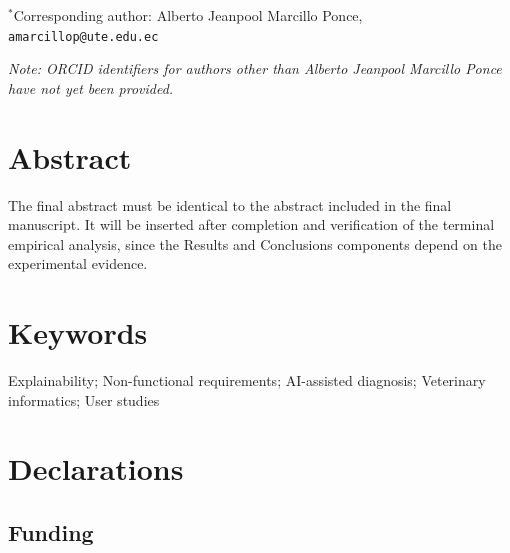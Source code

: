 \documentclass[12pt]{article}
\begin{document}
\vspace{0.5em}

\noindent
$^{\ast}$Corresponding author:
Alberto Jeanpool Marcillo Ponce,
\texttt{amarcillop@ute.edu.ec}

\vspace{0.5em}

\noindent
\textit{Note: ORCID identifiers for authors other than Alberto Jeanpool
Marcillo Ponce have not yet been provided.}

\vspace{1em}


\section*{Abstract}

The final abstract must be identical to the abstract included in the
final manuscript. It will be inserted after completion and verification
of the terminal empirical analysis, since the Results and Conclusions
components depend on the experimental evidence.


\section*{Keywords}

Explainability; Non-functional requirements; AI-assisted diagnosis;
Veterinary informatics; User studies

\vspace{1.5em}


\section*{Declarations}


\subsection*{Funding}
\end{document}

